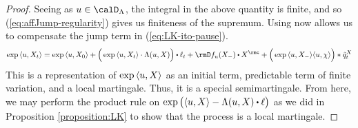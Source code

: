\begin{proof}
  Seeing as $\momentVar \in \odeSpace$, the integral in the above quantity is finite, and so (\ref{eq:affJump-regularity}) gives us finiteness of the supremum.
  Using \cite[Proposition II.1.28]{jacod2003} now allows us to compensate the jump term in (\ref{eq:LK-ito-pause}).
  \begin{equation*}
    \exp\prj{\momentVar}{\X_t}
    = \exp\prj{\momentVar}{\X_0} + \Big( \exp\prj{\momentVar}{\X_t} \cdot \ode(\momentVar, \X) \Big) \shortInt \leb_t + \Der f_\momentVar(\X_-) \shortInt \X^\rmc + \Big( \exp\prj{\momentVar}{\X_-} \prj{\momentVar}{\trunc} \Big) \ast \compensate{\jumpMeas^\X}_t 
  \end{equation*}
  This is a representation of $\exp{\langle u, X\rangle}$ as an initial term, predictable term of finite variation, and a local martingale.
  Thus, it is a special semimartingale.
  From here, we may perform the product rule on $\exp\big(\prj{\momentVar}{\X} - \ode(\momentVar, \X) \shortInt \leb\big)$ as we did in Proposition \ref{proposition:LK} to show that the process is a local martingale.
\end{proof}
